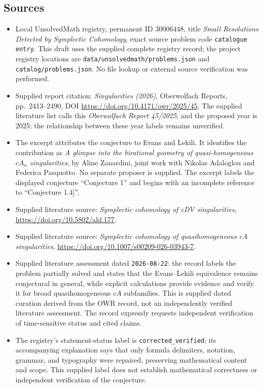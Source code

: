 \documentclass[11pt]{article}
\begin{document}
\subsection{Sources}
\begin{itemize}
\item Local UnsolvedMath registry, permanent ID \(30006448\), title \emph{Small Resolutions Detected by Symplectic Cohomology}, exact source problem code \texttt{catalogue entry}. This draft uses the supplied complete registry record; the project registry locations are \texttt{data/unsolvedmath/problems.json} and \texttt{catalog/problems.json}. No file lookup or external source verification was performed.
\item Supplied report citation: \emph{Singularities (2026)}, Oberwolfach Reports, pp.~2413--2490, DOI \url{https://doi.org/10.4171/owr/2025/45}. The supplied literature list calls this \emph{Oberwolfach Report 45/2025}, and the proposed year is 2025; the relationship between these year labels remains unverified.
\item The excerpt attributes the conjecture to Evans and Lekili. It identifies the contribution as \emph{A glimpse into the birational geometry of quasi-homogeneous \(cA_n\) singularities}, by Aline Zanardini, joint work with Nikolas Adaloglou and Federica Pasquotto. No separate proposer is supplied. The excerpt labels the displayed conjecture ``Conjecture 1'' and begins with an incomplete reference to ``Conjecture 1.4]''.
\item Supplied literature source: \emph{Symplectic cohomology of cDV singularities}, \url{https://doi.org/10.5802/ahl.177}.
\item Supplied literature source: \emph{Symplectic cohomology of quasihomogeneous cA singularities}, \url{https://doi.org/10.1007/s00209-026-03943-7}.
\item Supplied literature assessment dated \texttt{2026-08-22}: the record labels the problem partially solved and states that the Evans--Lekili equivalence remains conjectural in general, while explicit calculations provide evidence and verify it for broad quasihomogeneous \(cA\) subfamilies. This is supplied dated curation derived from the OWR record, not an independently verified literature assessment. The record expressly requests independent verification of time-sensitive status and cited claims.
\item The registry's statement-status label is \texttt{corrected\_verified}; its accompanying explanation says that only formula delimiters, notation, grammar, and typography were repaired, preserving mathematical content and scope. This supplied label does not establish mathematical correctness or independent verification of the conjecture.
\end{itemize}
\end{document}
